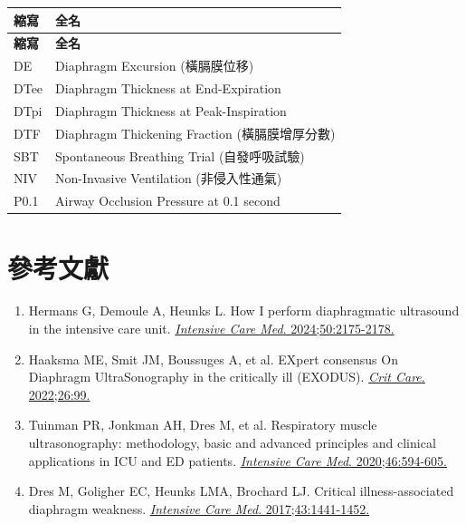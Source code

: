 \documentclass[12pt,a4paper]{article}
\begin{document}
\begin{longtable}{p{3cm}p{11cm}}
\toprule
\textbf{縮寫} & \textbf{全名} \\
\midrule
\endfirsthead

\toprule
\textbf{縮寫} & \textbf{全名} \\
\midrule
\endhead

\bottomrule
\endfoot

DE & Diaphragm Excursion (橫膈膜位移) \\
DTee & Diaphragm Thickness at End-Expiration \\
DTpi & Diaphragm Thickness at Peak-Inspiration \\
DTF & Diaphragm Thickening Fraction (橫膈膜增厚分數) \\
SBT & Spontaneous Breathing Trial (自發呼吸試驗) \\
NIV & Non-Invasive Ventilation (非侵入性通氣) \\
P0.1 & Airway Occlusion Pressure at 0.1 second \\
\bottomrule
\end{longtable}

\section{參考文獻}

\begin{enumerate}
    \item Hermans G, Demoule A, Heunks L. How I perform diaphragmatic ultrasound in the intensive care unit. \href{https://doi.org/10.1007/s00134-024-07688-x}{\textit{Intensive Care Med}. 2024;50:2175-2178.}

    \item Haaksma ME, Smit JM, Boussuges A, et al. EXpert consensus On Diaphragm UltraSonography in the critically ill (EXODUS). \href{https://doi.org/10.1186/s13054-022-03977-5}{\textit{Crit Care}. 2022;26:99.}

    \item Tuinman PR, Jonkman AH, Dres M, et al. Respiratory muscle ultrasonography: methodology, basic and advanced principles and clinical applications in ICU and ED patients. \href{https://doi.org/10.1007/s00134-020-05892-7}{\textit{Intensive Care Med}. 2020;46:594-605.}

    \item Dres M, Goligher EC, Heunks LMA, Brochard LJ. Critical illness-associated diaphragm weakness. \href{https://doi.org/10.1007/s00134-017-4928-4}{\textit{Intensive Care Med}. 2017;43:1441-1452.}
\end{enumerate}
\end{document}
